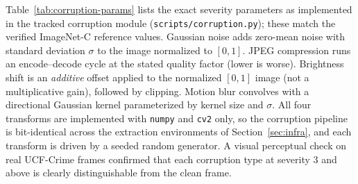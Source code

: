 Table~\ref{tab:corruption-params} lists the exact severity parameters as
implemented in the tracked corruption module
(\texttt{scripts/corruption.py}); these match the verified ImageNet-C
reference values. Gaussian noise adds zero-mean noise with standard deviation
$\sigma$ to the image normalized to $[0,1]$. JPEG compression runs an
encode--decode cycle at the stated quality factor (lower is worse). Brightness
shift is an \emph{additive} offset applied to the normalized $[0,1]$ image
(not a multiplicative gain), followed by clipping. Motion blur convolves with
a directional Gaussian kernel parameterized by kernel size and $\sigma$. All
four transforms are implemented with \texttt{numpy} and \texttt{cv2} only, so
the corruption pipeline is bit-identical across the extraction environments of
Section~\ref{sec:infra}, and each transform is driven by a seeded random
generator. A visual perceptual check on real UCF-Crime frames confirmed that
each corruption type at severity 3 and above is clearly distinguishable from
the clean frame.

\begin{table}[t]
\centering
\caption[UCF-Crime-C corruption severity parameterization]{UCF-Crime-C severity parameterization (severity 1 = mildest, 5 =
harshest), as implemented in the tracked corruption module
\texttt{scripts/corruption.py}. Brightness is an additive offset on the
normalized $[0,1]$ image. The final column indicates whether skeleton features
are re-extracted from the corrupted frames (Section~\ref{sec:reextraction});
visual features are re-extracted for all 20 conditions.}
\label{tab:corruption-params}
\end{table}

